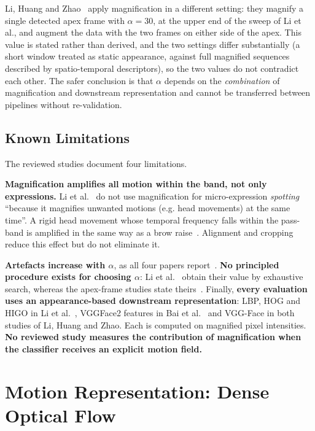 Li, Huang and Zhao~\cite{liY2018,liY2021} apply magnification in a different setting: they magnify a single detected apex frame with \textbf{$\alpha = 30$}, at the upper end of the sweep of Li et al., and augment the data with the two frames on either side of the apex. This value is stated rather than derived, and the two settings differ substantially (a short window treated as static appearance, against full magnified sequences described by spatio-temporal descriptors), so the two values do not contradict each other. The safer conclusion is that $\alpha$ depends on the \textit{combination} of magnification and downstream representation and cannot be transferred between pipelines without re-validation.

\subsection{Known Limitations}
\label{sec:evm-limitations}

The reviewed studies document four limitations.

\textbf{Magnification amplifies all motion within the band, not only expressions.} Li et al.~\cite{liX2018} do not use magnification for micro-expression \textit{spotting} ``because it magnifies unwanted motions (e.g. head movements) at the same time''. A rigid head movement whose temporal frequency falls within the pass-band is amplified in the same way as a brow raise~\cite{liX2018}. Alignment and cropping reduce this effect but do not eliminate it.

\textbf{Artefacts increase with $\alpha$}, as all four papers report~\cite{bai2021,liX2018,liY2018,liY2021}. \textbf{No principled procedure exists for choosing $\alpha$}: Li et al.~\cite{liX2018} obtain their value by exhaustive search, whereas the apex-frame studies state theirs~\cite{liY2018,liY2021}. Finally, \textbf{every evaluation uses an appearance-based downstream representation}: LBP, HOG and HIGO in Li et al.~\cite{liX2018}, VGGFace2 features in Bai et al.~\cite{bai2021} and VGG-Face in both studies of Li, Huang and Zhao. Each is computed on magnified pixel intensities. \textbf{No reviewed study measures the contribution of magnification when the classifier receives an explicit motion field.}


\section{Motion Representation: Dense Optical Flow}
\label{sec:flow-review}

